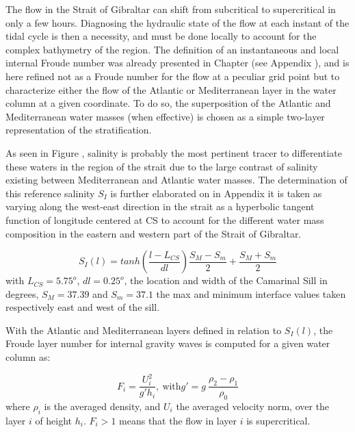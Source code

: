 The flow in the Strait of Gibraltar can shift from subcritical to supercritical in only a few hours. Diagnosing the hydraulic state of the flow at each instant of the tidal cycle is then a necessity, and must be done locally to account for the complex bathymetry of the region. The definition of an instantaneous and local internal Froude number was already presented in Chapter  (see Appendix ), and is here refined not as a Froude number for the flow at a peculiar grid point but to characterize either the flow of the Atlantic or Mediterranean layer in the water column at a given coordinate. To do so, the superposition of the Atlantic and Mediterranean water masses (when effective) is chosen as a simple two-layer representation of the stratification.

As seen in Figure , salinity is probably the most pertinent tracer to differentiate these waters in the region of the strait due to the large contrast of salinity existing between Mediterranean and Atlantic water masses. \color{red}The determination of this reference salinity $S_I$ is further elaborated on in Appendix  \color{black}it is taken as varying along the west-east direction in the strait as a hyperbolic tangent function of longitude centered at CS to account for the different water mass composition in the eastern and western part of the Strait of Gibraltar. 

\begin{equation}
	S_I(l)=tanh(\frac{l-L_{CS}}{dl})\frac{S_M-S_m}{2}+\frac{S_M+S_m}{2}
	\label{eqSinterface}
\end{equation}
with $L_{CS}=5.75^o$, $dl=0.25^o$, the location and width of the Camarinal Sill in degrees, $S_M=37.39$ and $S_m=37.1$ the max and minimum interface values taken respectively east and west of the sill.


With the Atlantic and Mediterranean layers defined in relation to $S_I(l)$, the Froude layer number for internal gravity waves is computed for a given water column as: 

\begin{equation}
F_i=\frac{U_i^2}{g'h_i} , \ \text{with} g'=g \ \frac{\rho_2-\rho_1}{\rho_0}
\end{equation}
where $\rho_i$ is the averaged density, and  $U_i$ the averaged velocity norm, over the layer $i$ of height $h_i$. $F_i>1$ means that the flow in layer $i$ is supercritical.

